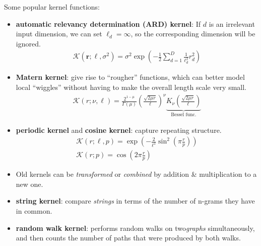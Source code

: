 Some popular kernel functions:
\begin{itemize}
    \item \textbf{automatic relevancy determination (ARD) kernel}: 
    If $d$ is an irrelevant input dimension, we can set $\ell_d = \infty$, 
    so the corresponding dimension will be ignored.
    \begin{gather}
        \mathcal{K}(\bm{r};\bm{\ell},\sigma^2)=\sigma^2\exp\left(
            -\frac{1}{2}\sum_{d=1}^D\frac{1}{\ell_d^2}r_d^2
        \right)
    \end{gather}

    \item \textbf{Matern kernel}: give rise to ``rougher'' functions,
    which can better model local ``wiggles'' without having to make the overall length scale very small.
    \begin{gather}
        \mathcal{K}(r;\nu,\ell)=\frac{2^{1-\mu}}{\Gamma(\mu)}\left(
            \frac{\sqrt{2\mu r}}{\ell}
        \right)^\nu
        \underbrace{K_\nu\left(
            \frac{\sqrt{2\mu r}}{\ell}
        \right)}_\text{Bessel func.}\label{eq:maternk}
    \end{gather}
    
    \item \textbf{periodic kernel} and \textbf{cosine kernel}: capture repeating structure.
    \begin{gather}
        \mathcal{K}(r;\ell,p)=\exp\left(
            -\frac{2}{\ell^2}\sin^2(\pi\frac{r}{p})
        \right) \\
        \mathcal{K}(r;p)=\cos(2\pi\frac{r}{p})
    \end{gather}
    
    \item Old kernels can be \textit{transformed} or \textit{combined} by addition \& multiplication to a new one.
    
    \item \textbf{string kernel}: compare \textit{strings} in terms of the number of n-grams they have in common.
    
    \item \textbf{random walk kernel}: performs random walks on two\textit{graphs} simultaneously, 
    and then counts the number of paths that were produced by both walks.
\end{itemize}

